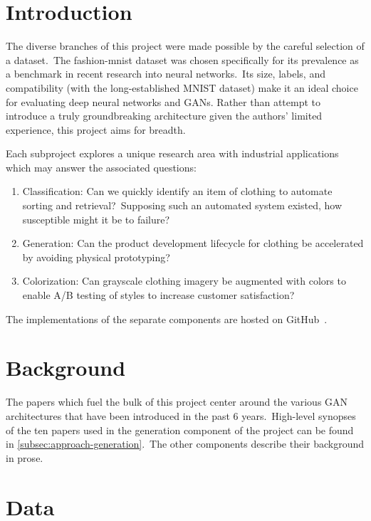 \documentclass[conference]{IEEEtran}
\begin{document}
    \section{Introduction}\label{sec:introduction}

    The diverse branches of this project were made possible by the careful selection of a dataset.\ The fashion-mnist dataset was chosen specifically for its prevalence as a benchmark in recent research into neural networks.\ Its size, labels, and compatibility (with the long-established MNIST dataset) make it an ideal choice for evaluating deep neural networks and GANs. Rather than attempt to introduce a truly groundbreaking architecture given the authors' limited experience, this project aims for breadth.

    Each subproject explores a unique research area with industrial applications which may answer the associated questions:

    \begin{enumerate}
        \item Classification: Can we quickly identify an item of clothing to automate sorting and retrieval?\ Supposing such an automated system existed, how susceptible might it be to failure?
        \item Generation: Can the product development lifecycle for clothing be accelerated by avoiding physical prototyping?
        \item Colorization: Can grayscale clothing imagery be augmented with colors to enable A/B testing of styles to increase customer satisfaction?
    \end{enumerate}

    The implementations of the separate components are hosted on GitHub~\cite{e-in-style,pytorch-generative-model-collections}.

    \section{Background}\label{sec:background}

    The papers which fuel the bulk of this project center around the various GAN architectures that have been introduced in the past 6 years.\ High-level synopses of the ten papers used in the generation component of the project can be found in \autoref{subsec:approach-generation}.\ The other components describe their background in prose.

    \section{Data}\label{sec:data}
\end{document}
